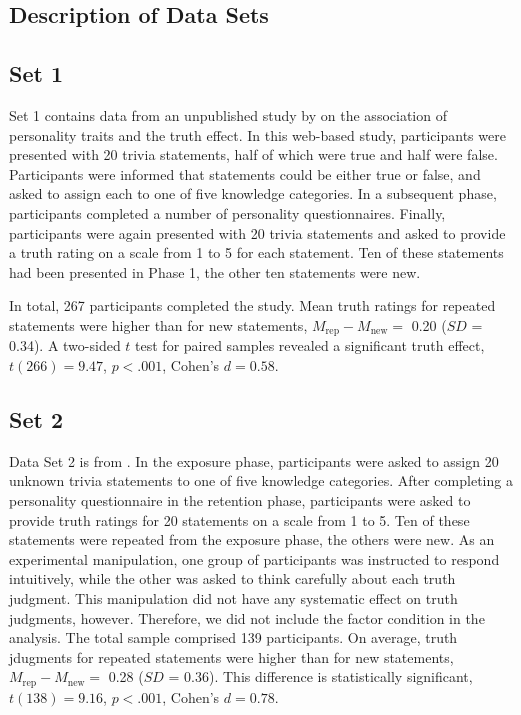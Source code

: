 \documentclass[
  english,
  ,man,floatsintext]{apa6}
\begin{document}
\begin{appendix}
\hypertarget{description-of-data-sets}{%
\section{Description of Data Sets}\label{description-of-data-sets}}

\label{sec:data}

\hypertarget{set-1}{%
\subsection{Set 1}\label{set-1}}

Set 1 contains data from an unpublished study by
\textcite{nadarevic2012} on the association of personality traits and
the truth effect. In this web-based study, participants were presented
with 20 trivia statements, half of which were true and half were false.
Participants were informed that statements could be either true or
false, and asked to assign each to one of five knowledge categories. In
a subsequent phase, participants completed a number of personality
questionnaires. Finally, participants were again presented with 20
trivia statements and asked to provide a truth rating on a scale from 1
to 5 for each statement. Ten of these statements had been presented in
Phase 1, the other ten statements were new.

In total, 267 participants completed the study. Mean truth ratings for
repeated statements were higher than for new statements,
\(M_\text{rep} - M_\text{new} =\) 0.20 (\(SD\) = 0.34). A two-sided
\(t\) test for paired samples revealed a significant truth effect,
\(t(266) = 9.47\), \(p < .001\), Cohen's \(d = 0.58\).

\hypertarget{set-2}{%
\subsection{Set 2}\label{set-2}}

Data Set 2 is from \textcite{nadarevic2011}. In the exposure phase,
participants were asked to assign 20 unknown trivia statements to one of
five knowledge categories. After completing a personality questionnaire
in the retention phase, participants were asked to provide truth ratings
for 20 statements on a scale from 1 to 5. Ten of these statements were
repeated from the exposure phase, the others were new. As an
experimental manipulation, one group of participants was instructed to
respond intuitively, while the other was asked to think carefully about
each truth judgment. This manipulation did not have any systematic
effect on truth judgments, however. Therefore, we did not include the
factor condition in the analysis. The total sample comprised 139
participants. On average, truth jdugments for repeated statements were
higher than for new statements, \(M_\text{rep} - M_\text{new} =\) 0.28
(\(SD\) = 0.36). This difference is statistically significant,
\(t(138) = 9.16\), \(p < .001\), Cohen's \(d = 0.78\).


\end{appendix}
\end{document}
